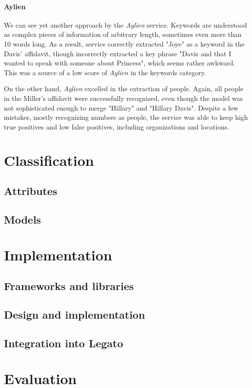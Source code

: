 \documentclass[
  digital, %
  table,   %
  lof,     %
  lot,     %
]{fithesis3}
\begin{document}
\subsubsection{\textbf{Aylien}}
We can see yet another approach by the \textit{Aylien} service.
Keywords are understood as complex pieces of information of arbitrary length, sometimes even more than 10 words long.
As a result, service correctly extracted "Joye" as a keyword in the Davis' affidavit, though incorrectly extracted a key phrase "Davis and that I wanted to speak with someone about Princess", which seems rather awkward.
This was a source of a low score of \textit{Aylien} in the keywords category.

On the other hand, \textit{Aylien} excelled in the extraction of people.
Again, all people in the Miller's affidavit were successfully recognized, even though the model was not sophisticated enough to merge "Hillary" and "Hillary Davis".
Despite a few mistakes, mostly recognizing numbers as people, the service was able to keep high true positives and low false positives, including organizations and locations.


\chapter{Classification}
\section{Attributes}
\section{Models}

\chapter{Implementation}
\section{Frameworks and libraries}
\section{Design and implementation}
\section{Integration into Legato}

\chapter{Evaluation}
\end{document}
